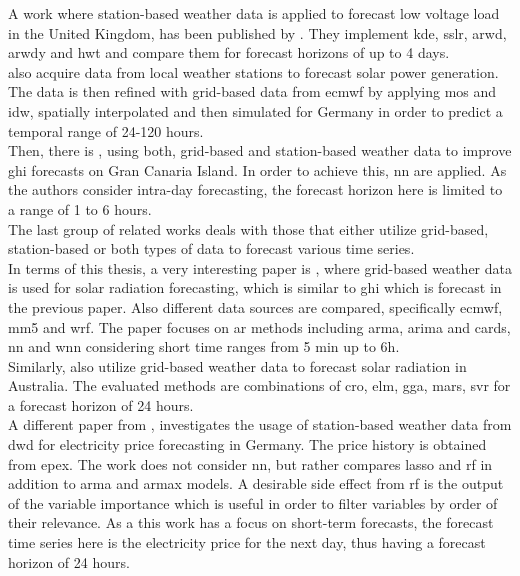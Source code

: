 A work where station-based weather data is applied to forecast low voltage load in the United Kingdom, has been published by . They implement \gls{kde}, \gls{sslr}, \gls{arwd}, \gls{arwdy} and \gls{hwt} and compare them for forecast horizons of up to 4 days.\\
 also acquire data from local weather stations to forecast solar power generation. The data is then refined with grid-based data from \gls{ecmwf} by applying \gls{mos} and \gls{idw}, spatially interpolated and then simulated for Germany in order to predict a temporal range of 24-120 hours.\\
Then, there is \eg {}, using both, grid-based and station-based weather data to improve \gls{ghi} forecasts on Gran Canaria Island. In order to achieve this, \gls{nn} are applied. As the authors consider intra-day forecasting, the forecast horizon here is limited to a range of 1 to 6 hours.\\
The last group of related works deals with those that either utilize grid-based, station-based or both types of data to forecast various time series.\\
In terms of this thesis, a very interesting paper is , where grid-based weather data is used for solar radiation forecasting, which is similar to \gls{ghi} which is forecast in the previous paper. Also different data sources are compared, specifically \gls{ecmwf}, \gls{mm5} and \gls{wrf}. The paper focuses on \gls{ar} methods including \gls{arma}, \gls{arima} and \gls{cards}, \gls{nn} and \gls{wnn} considering short time ranges from 5 min up to 6h.\\
Similarly,  also utilize grid-based weather data to forecast solar radiation in Australia. The evaluated methods are combinations of \gls{cro}, \gls{elm}, \gls{gga}, \gls{mars}, \gls{svr} for a forecast horizon of 24 hours.\\
A different paper from , investigates the usage of station-based weather data from \gls{dwd} for electricity price forecasting in Germany. The price history is obtained from \gls{epex}. The work does not consider \gls{nn}, but rather compares \gls{lasso} and \gls{rf} in addition to \gls{arma} and \gls{armax} models. A desirable side effect from \gls{rf} is the output of the variable importance which is useful in order to filter variables by order of their relevance. As a this work has a focus on short-term forecasts, the forecast time series here is the electricity price for the next day, thus having a forecast horizon of 24 hours.\\

